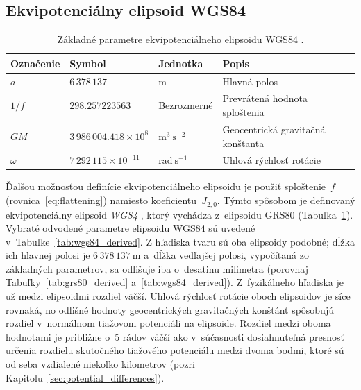\documentclass[a4paper, 12pt]{book}
\begin{document}
\subsection{Ekvipotenciálny elipsoid WGS84}
\label{sec:wgs84}

\begin{table}
\begin{center}
\caption{Základné parametre ekvipotenciálneho elipsoidu WGS84 
\parencite{WGS84}.}
\label{tab:wgs84_fundamental}
\small
\begin{tabular}{l l l l}
\hline
Označenie & Symbol & Jednotka & Popis\\
\hline
$a$       & $6\,378\,137$ & m & Hlavná polos\\
$1 \slash f$ & $298.257223563$ & Bezrozmerné & Prevrátená hodnota sploštenia\\
$GM$ & $3\,986\,004.418 \times 10^8$ & $\mathrm{m}^3 \ \mathrm{s}^{-2}$ 
& Geocentrická gravitačná konštanta\\
$\omega$ & $7\,292\,115 \times 10^{-11}$ & $\mathrm{rad} \ \mathrm{s}^{-1}$ 
& Uhlová rýchlosť rotácie\\
\hline
\end{tabular}
\end{center}
\end{table}

Ďalšou možnosťou definície ekvipotenciálneho elipsoidu je použiť sploštenie~$f$ 
(rovnica~\ref{eq:flattening}) namiesto koeficientu~$J_{2,0}$.  Týmto spôsobom 
je definovaný ekvipotenciálny elipsoid \emph{WGS4} 
\parencite[angl. \textit{World Geodetic System~1984};][]{WGS84}, ktorý vychádza 
z~elipsoidu GRS80 (Tabuľka~\ref{tab:wgs84_fundamental}).  Vybraté odvodené 
parametre elipsoidu WGS84 sú uvedené v~Tabuľke~\ref{tab:wgs84_derived}.  
Z hľadiska tvaru sú oba elipsoidy podobné; dĺžka ich hlavnej polosi je $6\, 
378\, 137\ \mathrm{m}$ a~dĺžka vedľajšej polosi, vypočítaná zo základných 
parametrov, sa odlišuje iba o~desatinu milimetra (porovnaj 
Tabuľky~\ref{tab:grs80_derived} a~\ref{tab:wgs84_derived}).  Z~fyzikálneho 
hľadiska je už medzi elipsoidmi rozdiel väčší.  Uhlová rýchlosť rotácie oboch 
elipsoidov je síce rovnaká, no odlišné hodnoty geocentrických gravitačných 
konštánt spôsobujú rozdiel v~normálnom tiažovom potenciáli na elipsoide.  
Rozdiel medzi oboma hodnotami je približne o~5 rádov väčší ako v~súčasnosti 
dosiahnuteľná presnosť určenia rozdielu skutočného tiažového potenciálu medzi 
dvoma bodmi, ktoré sú od seba vzdialené niekoľko kilometrov (pozri 
Kapitolu~\ref{sec:potential_differences}).
\end{document}
